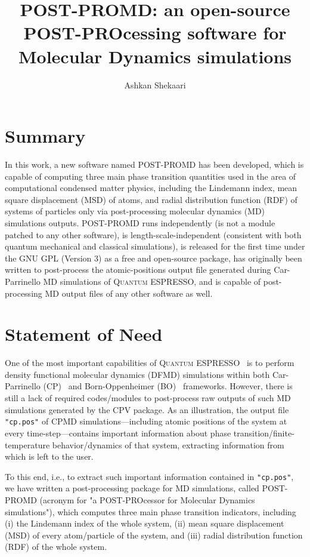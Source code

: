 \documentclass[11pt]{article}
\title{POST-PROMD: an open-source POST-PROcessing software for Molecular Dynamics simulations}
\author[1]{Ashkan Shekaari}
\affil[1]{Department of Physics, K. N. Toosi University of Technology, Tehran 15875-4416, Iran}
\date{}
\def\qe{\textsc{Quantum ESPRESSO}}
\begin{document}
\maketitle
\section*{Summary}
In this work, a new software named POST-PROMD has been developed, which is capable of computing three main phase transition quantities used in the area of computational condensed matter physics, including the Lindemann index, mean square displacement (MSD) of atoms, and radial distribution function (RDF) of systems of particles only via post-processing molecular dynamics (MD) simulations outputs. POST-PROMD runs independently (is not a module patched to any other software), is length-scale-independent (consistent with both quantum mechanical and classical simulations), is released for the first time under the GNU GPL (Version 3) as a free and open-source package, has originally been written to post-process the atomic-positions output file generated during Car-Parrinello MD simulations of \qe, and is capable of post-processing MD output files of any other software as well.
\section*{Statement of Need}
One of the most important capabilities of \qe~\cite{0} is to perform density functional molecular dynamics (DFMD) simulations within both Car-Parrinello (CP)~\cite{1} and Born-Oppenheimer (BO)~\cite{2,3} frameworks. However, there is still a lack of required codes/modules to post-process raw outputs of such MD simulations generated by the CPV package. As an illustration, the output file {\texttt{"cp.pos"}} of CPMD simulations---including atomic positions of the system at every time-step---contains important information about phase transition/finite-temperature behavior/dynamics of that system, extracting information from which is left to the user. 

To this end, i.e., to extract such important information contained in {\texttt{"cp.pos"}}, we have written a post-processing package for MD simulations, called POST-PROMD (acronym for "a POST-PROcessor for Molecular Dynamics simulations"), which computes three main phase transition indicators, including (i) the Lindemann index of the whole system, (ii) mean square displacement (MSD) of every atom/particle of the system, and (iii) radial distribution function (RDF) of the whole system. 
\end{document}
